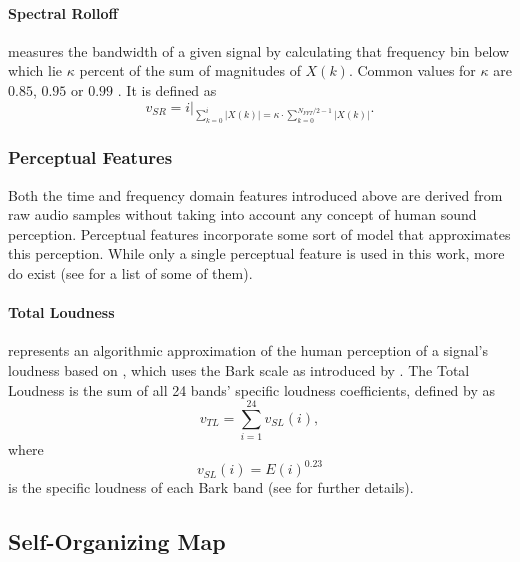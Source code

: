 \paragraph*{Spectral Rolloff}
\label{para:rolloff}
measures the bandwidth of a given signal by calculating that frequency bin
below which lie $\kappa$ percent of the sum of magnitudes of $X(k)$. Common
values for $\kappa$ are $0.85$, $0.95$ \citep{lerch2012} or $0.99$
\citep{web:meyda2019_features}. It is defined as
\begin{equation}
  v_{SR} = i \Bigg\rvert_{ \sum\limits_{k=0}^{i} |X(k)| = \kappa
  \cdot{ \sum\limits_{k=0}^{N_{FFT}/2-1} |X(k)| } }.
\end{equation}

\subsubsection{Perceptual Features}
\label{perceptual_features}
Both the time and frequency domain features introduced above are derived from
raw audio samples without taking into account any concept of human sound
perception. Perceptual features incorporate some sort of model that approximates
this perception. While only a single perceptual feature is used in this work,
more do exist (see \citet{peeters2004} for a list of some of them).

\paragraph*{Total Loudness}
\label{para:loudness}
represents an algorithmic approximation of the human perception of a signal's
loudness based on \citet{moore1997}, which uses the Bark scale as introduced by
\citet{zwicker1961}. The Total Loudness is the sum of all 24 bands' specific
loudness
coefficients, defined by \citet{peeters2004} as
\begin{equation}
  v_{TL} = \sum\limits_{i=1}^{24} v_{SL}(i),
\end{equation}
where
\begin{equation}
  v_{SL}(i) = E(i)^{0.23}
\end{equation}
is the specific loudness of each Bark band (see \citet{moore1997} for further
details).

\subsection{Self-Organizing Map}
\label{subsec:som}

